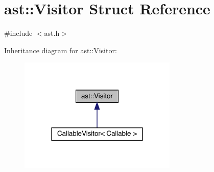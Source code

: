 \hypertarget{structast_1_1_visitor}{}\section{ast\+:\+:Visitor Struct Reference}
\label{structast_1_1_visitor}


{\ttfamily \#include $<$ast.\+h$>$}



Inheritance diagram for ast\+:\+:Visitor\+:\nopagebreak
\begin{figure}[H]
\begin{center}
\leavevmode
\includegraphics[width=213pt]{structast_1_1_visitor__inherit__graph}
\end{center}
\end{figure}
